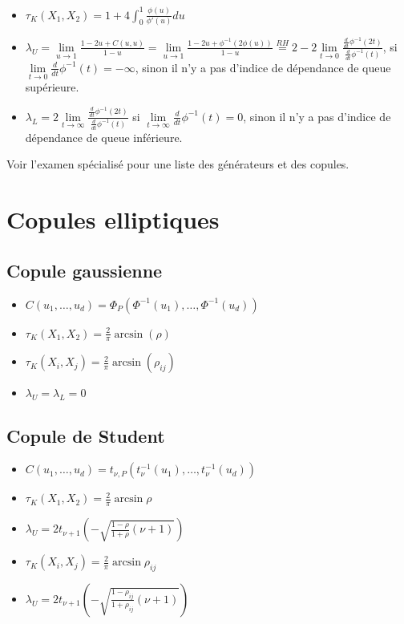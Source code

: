 \begin{itemize}
	\item $\displaystyle \tau_K(X_1, X_2) = 1 + 4\int_{0}^{1}\frac{\phi(u)}{\phi'(u)}du$
	\item $\displaystyle \lambda_U = \lim\limits_{u\to 1} \frac{1 - 2u + C(u, u)}{1-u} = \lim\limits_{u\to 1} \frac{1 - 2u + \phi^{-1}(2\phi(u))}{1-u} \stackrel{RH}{=} 2 - 2\lim\limits_{t \to 0} \frac{\frac{d}{dt}\phi^{-1}(2t)}{\frac{d}{dt}\phi^{-1}(t)}$, si $\displaystyle \lim\limits_{t\to 0}\frac{d}{dt}\phi^{-1}(t) = -\infty$, sinon il n'y a pas d'indice de dépendance de queue supérieure. 
	\item $\displaystyle \lambda_L = 2\lim\limits_{t\to \infty} \frac{\frac{d}{dt}\phi^{-1}(2t)}{\frac{d}{dt}\phi^{-1}(t)}$ si $\displaystyle \lim\limits_{t\to \infty} \frac{d}{dt}\phi^{-1}(t) = 0$, sinon il n'y a pas d'indice de dépendance de queue inférieure.
\end{itemize}

Voir l'examen spécialisé pour une liste des générateurs et des copules. 

\section{Copules elliptiques}

\subsection{Copule gaussienne}

\begin{itemize}
	\item $\displaystyle C(u_1, \dots, u_d) = \Phi_P(\Phi^{-1}(u_1), \dots, \Phi^{-1}(u_d))$
	\item $\displaystyle \tau_K(X_1, X_2) = \frac{2}{\pi}\arcsin(\rho)$
	\item $\displaystyle \tau_K(X_i, X_j) = \frac{2}{\pi}\arcsin(\rho_{ij})$
	\item $\lambda_U = \lambda_L = 0$
\end{itemize}

\subsection{Copule de Student}

\begin{itemize}
	\item $\displaystyle C(u_1, \dots, u_d) = t_{\nu, P}\left(t^{-1}_\nu(u_1), \dots, t^{-1}_\nu(u_d)\right)$
	\item $\displaystyle \tau_K(X_1, X_2) = \frac{2}{\pi}\arcsin \rho$
	\item $\displaystyle \lambda_U = 2t_{\nu + 1}\left(-\sqrt{\frac{1-\rho}{1 + \rho}(\nu + 1)}\right)$
	\item $\displaystyle \tau_K(X_i, X_j) = \frac{2}{\pi}\arcsin \rho_{ij}$
	\item $\displaystyle \lambda_U = 2t_{\nu + 1}\left(-\sqrt{\frac{1-\rho_{ij}}{1 + \rho_{ij}}(\nu + 1)}\right)$
\end{itemize}


